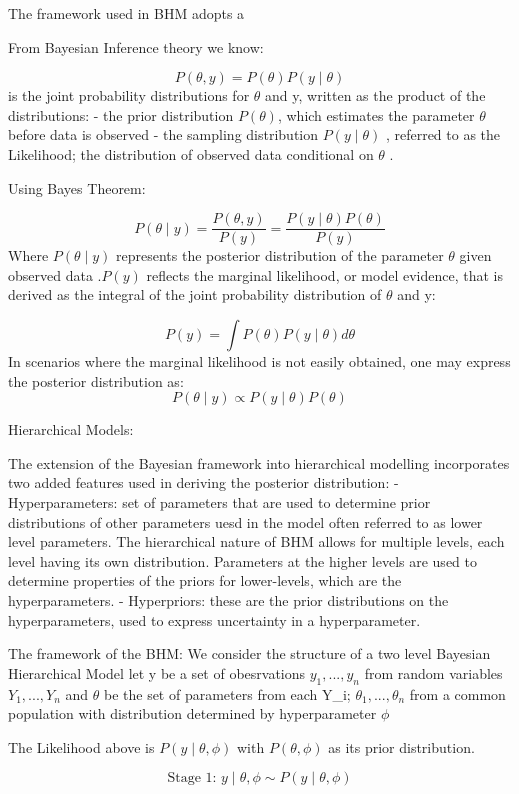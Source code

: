 \documentclass[
]{article}
\begin{document}
The framework used in BHM adopts a

From Bayesian Inference theory we know:

\[P(\theta ,y)=P(\theta)P(y\mid \theta)\] is the joint probability
distributions for \(\theta\) and y, written as the product of the
distributions: - the prior distribution \(P(\theta)\), which estimates
the parameter \(\theta\) before data is observed - the sampling
distribution \(P(y\mid \theta)\) , referred to as the Likelihood; the
distribution of observed data conditional on \(\theta\) .

Using Bayes Theorem:

\[P(\theta\mid y) = \frac{P(\theta,y)}{P(y)} = \frac{P(y\mid \theta)P(\theta)}{P(y)}\]
Where \(P(\theta\mid y)\) represents the posterior distribution of the
parameter \(\theta\) given observed data .\(P(y)\) reflects the marginal
likelihood, or model evidence, that is derived as the integral of the
joint probability distribution of \(\theta\) and y:

\[ P(y) = \int P(\theta)P(y\mid \theta) d\theta\] In scenarios where the
marginal likelihood is not easily obtained, one may express the
posterior distribution as:
\[P(\theta\mid y) \propto P(y\mid \theta) P(\theta) \]

Hierarchical Models:

The extension of the Bayesian framework into hierarchical modelling
incorporates two added features used in deriving the posterior
distribution: - Hyperparameters: set of parameters that are used to
determine prior distributions of other parameters uesd in the model
often referred to as lower level parameters. The hierarchical nature of
BHM allows for multiple levels, each level having its own distribution.
Parameters at the higher levels are used to determine properties of the
priors for lower-levels, which are the hyperparameters. - Hyperpriors:
these are the prior distributions on the hyperparameters, used to
express uncertainty in a hyperparameter.

The framework of the BHM: We consider the structure of a two level
Bayesian Hierarchical Model let y be a set of obesrvations
\(y_1,...,y_n\) from random variables \(Y_1,...,Y_n\) and \(\theta\) be
the set of parameters from each Y\_i; \(\theta_1,...,\theta_n\) from a
common population with distribution determined by hyperparameter
\(\phi\)

The Likelihood above is \(P(y\mid\theta,\phi)\) with \(P(\theta,\phi)\)
as its prior distribution.

\[\text{Stage 1: }y\mid\theta,\phi \sim P(y\mid\theta,\phi)\]
\end{document}
